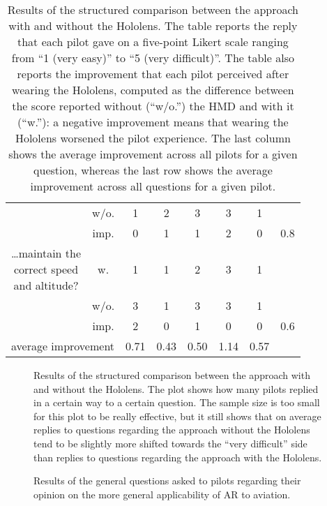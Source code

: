 \begin{table}
\begin{tabular}{c c c c c c c c}
                            & w/o. & 1 & 2 & 3 & 3 & 1 & \\
                            & imp. & 0 & 1 & 1 & 2 & 0 & 0.8\\
    \midrule
        \multirowcell{3}{\ldots maintain the\\correct speed\\and altitude? } & w.   & 1 & 1 & 2 & 3 & 1 & \\
                            & w/o. & 3 & 1 & 3 & 3 & 1 & \\
                            & imp. & 2 & 0 & 1 & 0 & 0 & 0.6\\
    \midrule
        \multicolumn{2}{c}{average improvement} & 0.71 & 0.43 & 0.50 & 1.14 & 0.57 &\\
    \bottomrule
  \end{tabular}
  \caption{Results of the structured comparison between the approach with and without the Hololens. The table reports the reply that each pilot gave on a five-point Likert scale ranging from \enquote{1 (very easy)} to \enquote{5 (very difficult)}. The table also reports the improvement that each pilot perceived after wearing the Hololens, computed as the difference between the score reported without (\enquote{w/o.}) the \gls{HMD} and with it (\enquote{w.}): a negative improvement means that wearing the Hololens worsened the pilot experience. The last column shows the average improvement across all pilots for a given question, whereas the last row shows the average improvement across all questions for a given pilot.}\label{table:questionnaire_part_two_results}
\end{table}

\begin{figure}[p]
  \centering
  
  \caption{Results of the structured comparison between the approach with and without the Hololens. The plot shows how many pilots replied in a certain way to a certain question. The sample size is too small for this plot to be really effective, but it still shows that on average replies to questions regarding the approach without the Hololens tend to be slightly more shifted towards the \enquote{very difficult} side than replies to questions regarding the approach with the Hololens.}\label{fig:questionnaire_part_two_results_likert}
\end{figure}


\begin{figure}
  \centering
  
  \caption{Results of the general questions asked to pilots regarding their opinion on the more general applicability of \gls{AR} to aviation.}\label{fig:questionnaire_part_two_results_general_questions}
\end{figure}

